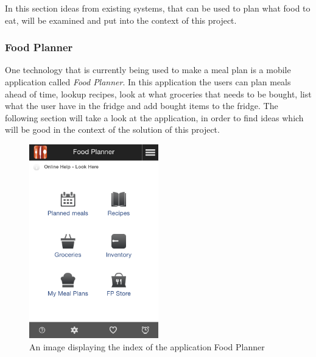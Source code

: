 In this section ideas from existing systems, that can be used to plan what food to eat, will be examined and put into the context of this project. 

\subsubsection{Food Planner}
One technology that is currently being used to make a meal plan is a mobile application called \textit{Food Planner}.
In this application the users can plan meals ahead of time, lookup recipes, look at what groceries that needs to be bought, list what the user have in the fridge and add bought items to the fridge.
The following section will take a look at the application, in order to find ideas which will be good in the context of the solution of this project.

\begin{figure}[H]
    \centering
    \includegraphics[width=0.5\textwidth]{Grafik/FoodPlanner/index}
    \caption{An image displaying the index of the application Food Planner}
    \label{FoodPlannerIndex}
\end{figure}

